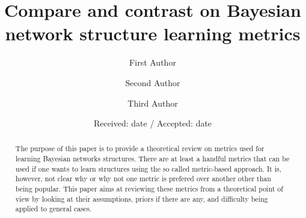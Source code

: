 \makeatletter
\newcommand*{\centernot}{%
  \mathpalette\@centernot
}
\def\@centernot#1#2{%
  \mathrel{%
    \rlap{%
      \settowidth\dimen@{$\m@th#1{#2}$}%
      \kern.5\dimen@
      \settowidth\dimen@{$\m@th#1=$}%
      \kern-.5\dimen@
      $\m@th#1\not$%
    }%
    {#2}%
  }%
}
\makeatother

%
%



\title{Compare and contrast on Bayesian network structure learning metrics%
}


\author{First Author         \and
        Second Author \and
        Third Author
}



\date{Received: date / Accepted: date}

\maketitle

\begin{abstract}
\label{sec:abst}
The purpose of this paper is to provide a theoretical review on metrics used for learning Bayesian networks structures. There are at least a handful metrics that can be used if one wants to learn structures using the so called metric-based approach. It is, however, not clear why or why not one metric is prefered over another other than being popular. This paper aims at reviewing these metrics from a theoretical point of view by looking at their assumptions, priors if there are any, and difficulty being applied to general cases.  
\end{abstract}

